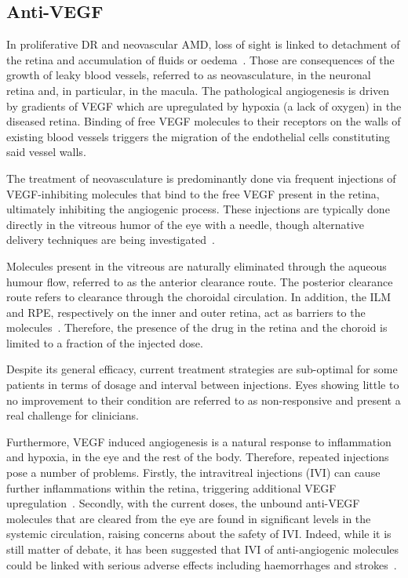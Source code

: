 \documentclass{article}
\begin{document}
\subsection{Anti-VEGF}

In proliferative DR and neovascular AMD, loss of sight is linked to detachment of the retina and accumulation of fluids or oedema~\cite{Roberts_2020, Waldstein_2016}.
Those are consequences of the growth of leaky blood vessels, referred to as neovasculature, in the neuronal retina and, in particular, in the macula.
The pathological angiogenesis is driven by gradients of VEGF which are upregulated by hypoxia (a lack of oxygen) in the diseased retina.
Binding of free VEGF molecules to their receptors on the walls of existing blood vessels triggers the migration of the endothelial cells constituting said vessel walls.

The treatment of neovasculature is predominantly done via frequent injections of VEGF-inhibiting molecules that bind to the free VEGF present in the retina, ultimately inhibiting the angiogenic process.
These injections are typically done directly in the vitreous humor of the eye with a needle, though alternative delivery techniques are being investigated~\cite{Kim_2021}.

Molecules present in the vitreous are naturally eliminated through the aqueous humour flow, referred to as the anterior clearance route.
The posterior clearance route refers to clearance through the choroidal circulation.
In addition, the ILM and RPE, respectively on the inner and outer retina, act as barriers to the molecules~\cite{Park_2015}.
Therefore, the presence of the drug in the retina and the choroid is limited to a fraction of the injected dose. 

Despite its general efficacy, current treatment strategies are sub-optimal for some patients in terms of dosage and interval between injections.
Eyes showing little to no improvement to their condition are referred to as non-responsive and present a real challenge for clinicians.

Furthermore, VEGF induced angiogenesis is a natural response to inflammation and hypoxia, in the eye and the rest of the body. 
Therefore, repeated injections pose a number of problems.
Firstly, the intravitreal injections (IVI) can cause further inflammations within the retina, triggering additional VEGF upregulation~\cite{Iyer_2022}.
Secondly, with the current doses, the unbound anti-VEGF molecules that are cleared from the eye are found in significant levels in the systemic circulation, raising concerns about the safety of IVI.
Indeed, while it is still matter of debate, it has been suggested that IVI of anti-angiogenic molecules could be linked with serious adverse effects including haemorrhages and strokes~\cite{Avery_2016, Kaiser_2019, Maloney_2021}.
\end{document}
